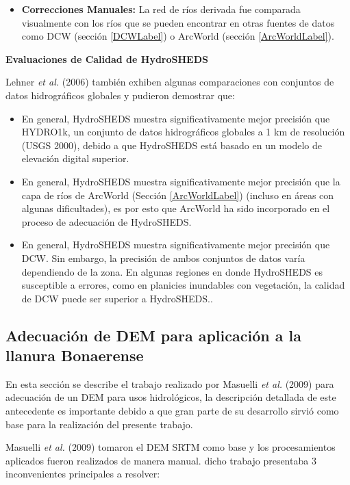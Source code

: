 \documentclass[10pt,a4paper, twoside]{report}
\begin{document}
\begin{itemize}
	\item \textbf{Correcciones Manuales:} La red de ríos derivada fue comparada visualmente con los ríos que se pueden encontrar en otras fuentes de datos como DCW (sección \ref{DCWLabel}) o ArcWorld (sección \ref{ArcWorldLabel}). 
	
\end{itemize}


\textbf{Evaluaciones de Calidad de HydroSHEDS}

Lehner \textit{et al.} (2006) también exhiben algunas comparaciones con conjuntos de datos hidrográficos globales y pudieron demostrar que:

\begin{itemize}
	\item En general, HydroSHEDS muestra significativamente mejor precisión que HYDRO1k, un conjunto de datos hidrográficos globales a 1 km de resolución (USGS 2000), debido a que HydroSHEDS está basado en un modelo de elevación digital superior.
	\item En general, HydroSHEDS muestra significativamente mejor precisión que la capa de ríos de ArcWorld (Sección \ref{ArcWorldLabel}) (incluso en áreas con algunas dificultades), es por esto que ArcWorld ha sido incorporado en el proceso de adecuación de HydroSHEDS.
	\item En general, HydroSHEDS muestra significativamente mejor precisión que DCW. Sin embargo, la precisión de ambos conjuntos de datos varía dependiendo de la zona. En algunas regiones en donde HydroSHEDS es susceptible a errores, como en planicies inundables con vegetación, la calidad de DCW puede ser superior a HydroSHEDS..
\end{itemize}



\subsection{Adecuación de DEM para aplicación a la llanura Bonaerense}
\label{trabajoSergioAntecedente}

En esta sección se describe el trabajo realizado por Masuelli \textit{et al.} (2009) para adecuación de un DEM para usos hidrológicos, la descripción detallada de este antecedente es importante debido a que gran parte de su desarrollo sirvió como base para la realización del presente trabajo.

Masuelli \textit{et al.} (2009) tomaron el DEM SRTM como base y los procesamientos aplicados fueron realizados de manera manual. dicho trabajo presentaba 3 inconvenientes principales a resolver:
\end{document}
